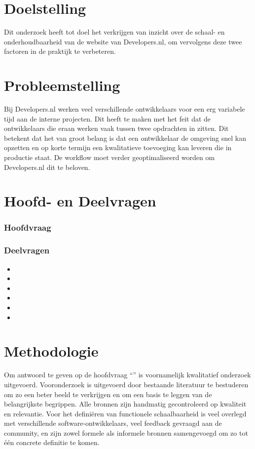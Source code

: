 \section{Doelstelling}
Dit onderzoek heeft tot doel het verkrijgen van inzicht over de schaal- en onderhoudbaarheid van de website van Developers.nl, om vervolgens deze twee factoren in de praktijk te verbeteren.

\section{Probleemstelling}
Bij Developers.nl werken veel verschillende ontwikkelaars voor een erg variabele tijd aan de interne projecten. Dit heeft te maken met het feit dat de ontwikkelaars die eraan werken vaak tussen twee opdrachten in zitten. Dit betekent dat het van groot belang is dat een ontwikkelaar de omgeving snel kan opzetten en op korte termijn een kwalitatieve toevoeging kan leveren die in productie staat. De workflow moet verder geoptimaliseerd worden om Developers.nl dit te beloven.

\section{Hoofd- en Deelvragen}
\subsubsection{Hoofdvraag}
\hoofdvraagname

\subsubsection{Deelvragen}
\begin{itemize}
	\item \deelverwachtingen
	\item \deeltechnieken
	\item \deelhuidig
	\item \deelverbetering
	\item \deelimplementatie
	\item \deelrequirements
\end{itemize}

\section{Methodologie}
Om antwoord te geven op de hoofdvraag \enquote{\hoofdvraagname} is voornamelijk kwalitatief onderzoek uitgevoerd. Vooronderzoek is uitgevoerd door bestaande literatuur te bestuderen om zo een beter beeld te verkrijgen en om een basis te leggen van de belangrijkste begrippen. Alle bronnen zijn handmatig gecontroleerd op kwaliteit en relevantie. Voor het definiëren van functionele schaalbaarheid is veel overlegd met verschillende software-ontwikkelaars, veel feedback gevraagd aan de community, en zijn zowel formele als informele bronnen samengevoegd om zo tot één concrete definitie te komen. 

